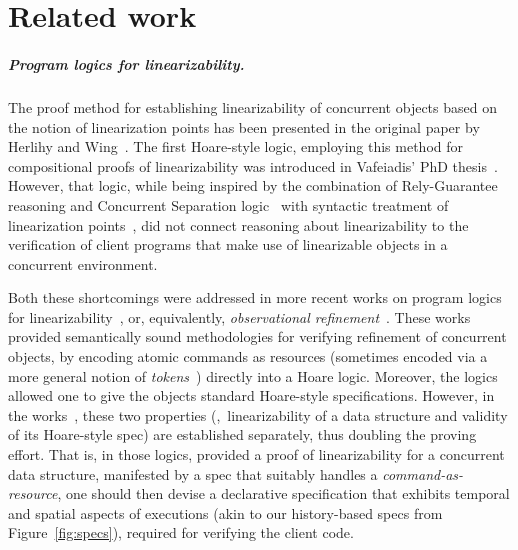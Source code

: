 \section{Related work}
\label{sc:related}


\subparagraph*{Program logics for linearizability.}

The proof method for establishing linearizability of concurrent
objects based on the notion of linearization points has been presented
in the original paper by Herlihy and
Wing~\cite{HerlihyW+TOPLAS90}. The first Hoare-style logic, employing
this method for compositional proofs of linearizability was introduced
in Vafeiadis' PhD thesis~\cite{VafeiadisHHS+PPoPP06, Vafeiadis+PhD07}.
However, that logic, while being inspired by the combination of
Rely-Guarantee reasoning and Concurrent Separation
logic~\cite{VafeiadisP+CONCUR07} with syntactic treatment of
linearization points~\cite{VafeiadisHHS+PPoPP06}, did not connect
reasoning about linearizability to the verification of client programs
that make use of linearizable objects in a concurrent environment.


%


Both these shortcomings were addressed in more recent works on program
logics for linearizability~\cite{LiangF+PLDI13,KhyzhaGP+FM16}, or,
equivalently, \emph{observational
  refinement}~\cite{FilipovicOHRW+TCS10,TuronDB+ICFP13}. These works
provided semantically sound methodologies for verifying refinement of
concurrent objects, by encoding atomic commands as resources
(sometimes encoded via a more general notion of
\emph{tokens}~\cite{KhyzhaGP+FM16}) directly into a Hoare
logic. Moreover, the logics~\cite{LiangF+PLDI13, TuronDB+ICFP13}
allowed one to give the objects standard Hoare-style specifications.
%
However, in the works~\cite{LiangF+PLDI13,TuronDB+ICFP13}, these two
properties (\ie,~linearizability of a data structure and validity of
its Hoare-style spec) are established separately, thus doubling the
proving effort.
%
That is, in those logics, provided a proof of linearizability for a
concurrent data structure, manifested by a spec that suitably handles
a \emph{command-as-resource}, one should then devise a declarative
specification that exhibits temporal and spatial aspects of executions
(akin to our history-based specs from Figure~\ref{fig:specs}),
required for verifying the client code.

